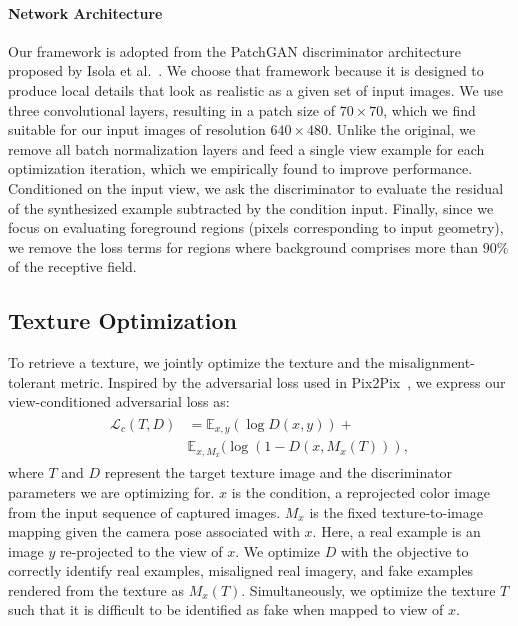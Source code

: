 \paragraph{Network Architecture}
%
Our framework is adopted from the PatchGAN discriminator architecture proposed by Isola et al.~\cite{isola2017image}.  We choose that framework because it is designed to produce local details that look as realistic as a given set of input images.
%
We use three convolutional layers, resulting in a patch size of $70\times 70$, which we find suitable for our input images of resolution $640\times 480$.
%
Unlike the original, we remove all batch normalization layers and feed a single view example for each optimization iteration, which we empirically found to improve performance.
%
Conditioned on the input view, we ask the discriminator to evaluate the residual of the synthesized example subtracted by the condition input.
%
Finally, since we focus on evaluating foreground regions (pixels corresponding to input geometry), we remove the loss terms for regions where background comprises more than $90\%$ of the receptive field.
%

\subsection{Texture Optimization}%

%
To retrieve a texture, we jointly optimize the texture and the misalignment-tolerant metric.
%
Inspired by the adversarial loss used in Pix2Pix~\cite{isola2017image}, we express our view-conditioned adversarial loss as:
\begin{align}
\begin{split}
    \mathcal{L}_c(T,D) &= \mathbb{E}_{x,y}(\log D(x,y)) +\\ &\mathbb{E}_{x,M_x}(\log (1 - D(x, M_x(T) ) ),
\end{split}
\end{align}
where $T$ and $D$ represent the target texture image and the discriminator parameters we are optimizing for.
%
$x$ is the condition, a reprojected color image from the input sequence of captured images.
%
$M_x$ is the fixed texture-to-image mapping given the camera pose associated with $x$. 
%
Here, a real example is an image $y$ re-projected to the view of $x$.
%
We optimize $D$ with the objective to correctly identify real examples, misaligned real imagery, and fake examples rendered from the texture as $M_x(T)$. 
%
Simultaneously, we optimize the texture $T$ such that it is difficult to be identified as fake when mapped to view of $x$.
%

